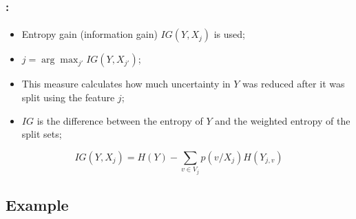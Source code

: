 \documentclass[xcolor=table]{beamer}
\begin{document}
\begin{frame}
	\frametitle{\insertshortsubtitle: \insertsection}
	\framesubtitle{\insertsubsection}
	
	\begin{itemize}
		\item Entropy gain (information gain) $IG(Y, X_j)$ is used;
		\item $j = \arg\max_{j'} IG(Y, X_{j'})$;
		\item This measure calculates how much uncertainty in $Y$ was reduced after it was split using the feature $j$;
		\item $ IG $ is the difference between the entropy of $Y$ and the weighted entropy of the split sets;
	\end{itemize}

	\[IG(Y, X_j) = H(Y) - \sum_{v \in V_j} p(v/X_j) H(Y_{j, v})\]
	
	
\end{frame}

\subsection{Example}
\end{document}
